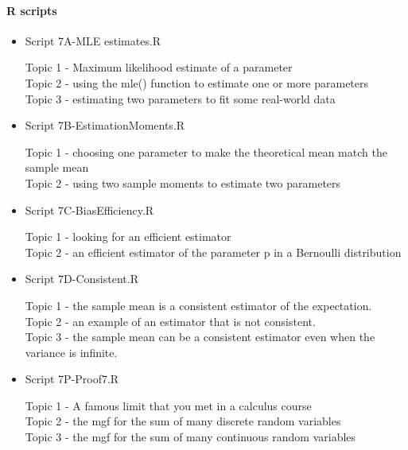 \documentclass[12pt]{article}
\begin{document}
\pagebreak


\paragraph*{R scripts}
\begin{itemize}
\item Script 7A-MLE estimates.R

Topic 1 - Maximum likelihood estimate of a parameter\\
Topic 2 - using the mle() function to estimate one or more parameters\\
Topic 3 - estimating two parameters to fit some real-world data\\

\item Script 7B-EstimationMoments.R

Topic 1 - choosing one parameter to make the theoretical mean match the sample mean\\
Topic 2 - using two sample moments to estimate two parameters\\

\item Script 7C-BiasEfficiency.R

Topic 1 - looking for an efficient estimator\\
Topic 2 - an efficient estimator of the parameter p in a Bernoulli distribution\\

\item Script 7D-Consistent.R

Topic 1 - the sample mean is a consistent estimator of the expectation.\\
Topic 2 - an example of an estimator that is not consistent.\\
Topic 3 - the sample mean can be a consistent estimator even when the variance is infinite.\\

\item Script 7P-Proof7.R

Topic 1 - A famous limit that you met in a calculus course\\
Topic 2 - the mgf for the sum of many discrete random variables\\
Topic 3 - the mgf for the sum of many continuous random variables\\



\end{itemize}
\end{document}
